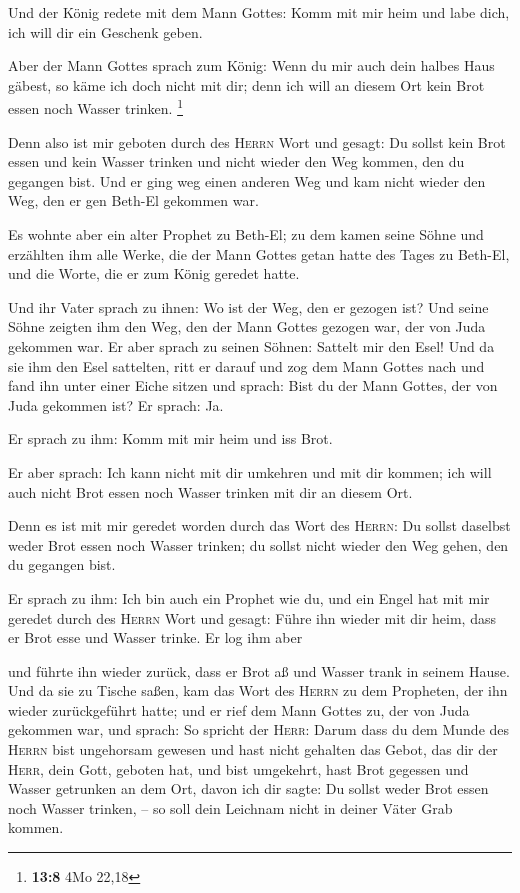 Und der König redete mit dem Mann Gottes: Komm mit mir
heim und labe dich, ich will dir ein Geschenk geben.

 Aber der Mann Gottes sprach zum König: Wenn du mir auch
dein halbes Haus gäbest, so käme ich doch nicht mit dir; denn ich will
an diesem Ort kein Brot essen noch Wasser trinken. \footnote{\textbf{13:8}
  4Mo 22,18}

 Denn also ist mir geboten durch des \textsc{Herrn} Wort
und gesagt: Du sollst kein Brot essen und kein Wasser trinken und nicht
wieder den Weg kommen, den du gegangen bist.  Und er ging
weg einen anderen Weg und kam nicht wieder den Weg, den er gen Beth-El
gekommen war.

 Es wohnte aber ein alter Prophet zu Beth-El; zu dem
kamen seine Söhne und erzählten ihm alle Werke, die der Mann Gottes
getan hatte des Tages zu Beth-El, und die Worte, die er zum König
geredet hatte.

 Und ihr Vater sprach zu ihnen: Wo ist der Weg, den er
gezogen ist? Und seine Söhne zeigten ihm den Weg, den der Mann Gottes
gezogen war, der von Juda gekommen war.  Er aber sprach
zu seinen Söhnen: Sattelt mir den Esel! Und da sie ihm den Esel
sattelten, ritt er darauf  und zog dem Mann Gottes nach
und fand ihn unter einer Eiche sitzen und sprach: Bist du der Mann
Gottes, der von Juda gekommen ist? Er sprach: Ja.

 Er sprach zu ihm: Komm mit mir heim und iss Brot.

 Er aber sprach: Ich kann nicht mit dir umkehren und mit
dir kommen; ich will auch nicht Brot essen noch Wasser trinken mit dir
an diesem Ort.

 Denn es ist mit mir geredet worden durch das Wort des
\textsc{Herrn}: Du sollst daselbst weder Brot essen noch Wasser trinken;
du sollst nicht wieder den Weg gehen, den du gegangen bist.

 Er sprach zu ihm: Ich bin auch ein Prophet wie du, und
ein Engel hat mit mir geredet durch des \textsc{Herrn} Wort und gesagt:
Führe ihn wieder mit dir heim, dass er Brot esse und Wasser trinke. Er
log ihm aber

 und führte ihn wieder zurück, dass er Brot aß und Wasser
trank in seinem Hause.  Und da sie zu Tische saßen, kam
das Wort des \textsc{Herrn} zu dem Propheten, der ihn wieder
zurückgeführt hatte;  und er rief dem Mann Gottes zu, der
von Juda gekommen war, und sprach: So spricht der \textsc{Herr}: Darum
dass du dem Munde des \textsc{Herrn} bist ungehorsam gewesen und hast
nicht gehalten das Gebot, das dir der \textsc{Herr}, dein Gott, geboten
hat,  und bist umgekehrt, hast Brot gegessen und Wasser
getrunken an dem Ort, davon ich dir sagte: Du sollst weder Brot essen
noch Wasser trinken, -- so soll dein Leichnam nicht in deiner Väter Grab
kommen.

